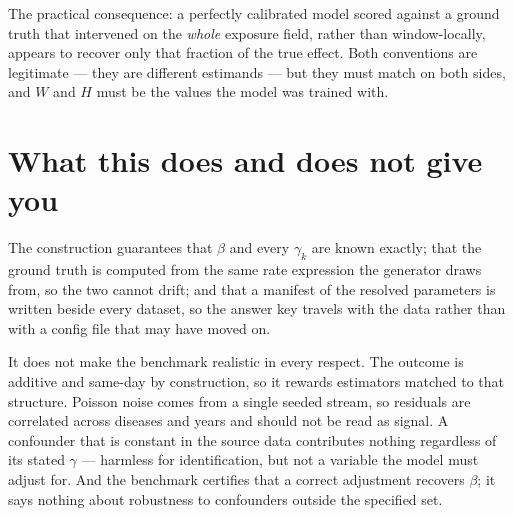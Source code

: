 \documentclass[11pt]{article}
\begin{document}
The practical consequence: a perfectly calibrated model scored against a ground truth that
intervened on the \emph{whole} exposure field, rather than window-locally, appears to recover only
that fraction of the true effect. Both conventions are legitimate --- they are different estimands
--- but they must match on both sides, and $W$ and $H$ must be the values the model was trained
with.

\section{What this does and does not give you}

The construction guarantees that $\beta$ and every $\gamma_k$ are known exactly; that the ground
truth is computed from the same rate expression the generator draws from, so the two cannot drift;
and that a manifest of the resolved parameters is written beside every dataset, so the answer key
travels with the data rather than with a config file that may have moved on.

It does not make the benchmark realistic in every respect. The outcome is additive and same-day by
construction, so it rewards estimators matched to that structure. Poisson noise comes from a single
seeded stream, so residuals are correlated across diseases and years and should not be read as
signal. A confounder that is constant in the source data contributes nothing regardless of its
stated $\gamma$ --- harmless for identification, but not a variable the model must adjust for. And
the benchmark certifies that a correct adjustment recovers $\beta$; it says nothing about
robustness to confounders outside the specified set.
\end{document}
